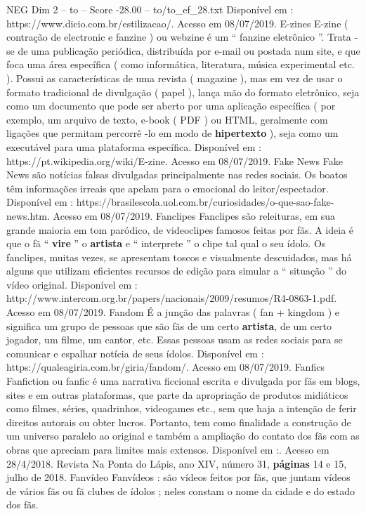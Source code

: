 \begin{textsample}{NEG Dim 2 – to – Score -28.00 – to/to\_ef\_28.txt}
Disponível em : https://www.dicio.com.br/estilizacao/.
Acesso em 08/07/2019.
E-zines E-zine ( contração de electronic e fanzine ) ou webzine é um “ fanzine eletrônico ”.
Trata -se de uma publicação periódica, distribuída por e-mail ou postada num site, e que foca uma área específica ( como informática, literatura, música experimental etc. ).
Possui as características de uma revista ( magazine ), mas em vez de usar o formato tradicional de divulgação ( papel ), lança mão do formato eletrônico, seja como um documento que pode ser aberto por uma aplicação específica ( por exemplo, um arquivo de texto, e-book ( PDF ) ou HTML, geralmente com ligações que permitam percorrê -lo em modo de \textbf{hipertexto} ), seja como um executável para uma plataforma específica.
Disponível em : https://pt.wikipedia.org/wiki/E-zine.
Acesso em 08/07/2019.
Fake News Fake News são notícias falsas divulgadas principalmente nas redes sociais.
Os boatos têm informações irreais que apelam para o emocional do leitor/espectador.
Disponível em : https://brasilescola.uol.com.br/curiosidades/o-que-sao-fake-news.htm.
Acesso em 08/07/2019.
Fanclipes Fanclipes são releituras, em sua grande maioria em tom paródico, de videoclipes famosos feitas por fãs.
A ideia é que o fã “ \textbf{vire} ” o \textbf{artista} e “ interprete ” o clipe tal qual o seu ídolo.
Os fanclipes, muitas vezes, se apresentam toscos e visualmente descuidados, mas há alguns que utilizam eficientes recursos de edição para simular a “ situação ” do vídeo original.
Disponível em : http://www.intercom.org.br/papers/nacionais/2009/resumos/R4-0863-1.pdf.
Acesso em 08/07/2019.
Fandom É a junção das palavras ( fan + kingdom ) e significa um grupo de pessoas que são fãs de um certo \textbf{artista}, de um certo jogador, um filme, um cantor, etc.
Essas pessoas usam as redes sociais para se comunicar e espalhar notícia de seus ídolos.
Disponível em : https://qualeagiria.com.br/giria/fandom/.
Acesso em 08/07/2019.
Fanfics Fanfiction ou fanfic é uma narrativa ficcional escrita e divulgada por fãs em blogs, sites e em outras plataformas, que parte da apropriação de produtos midiáticos como filmes, séries, quadrinhos, videogames etc., sem que haja a intenção de ferir direitos autorais ou obter lucros.
Portanto, tem como finalidade a construção de um universo paralelo ao original e também a ampliação do contato dos fãs com as obras que apreciam para limites mais extensos.
Disponível em :.
Acesso em 28/4/2018.
Revista Na Ponta do Lápis, ano XIV, número 31, \textbf{páginas} 14 e 15, julho de 2018.
Fanvídeo Fanvídeos : são vídeos feitos por fãs, que juntam vídeos de vários fãs ou fã clubes de ídolos ; neles constam o nome da cidade e do estado dos fãs.

\end{textsample}
